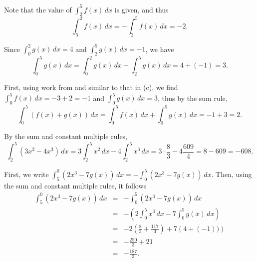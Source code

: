 \begin{activitySolution}
\ba
	\item Note that the value of $\int_2^5 f(x) \, dx$ is given, and thus
	$$\int_5^2 f(x) \,dx = -\int_2^5 f(x) \, dx = -2.$$
	\item Since $\int_0^2 g(x) \,dx = 4$ and $\int_2^5 g(x) \,dx = -1$, we have
	$$\int_0^5 g(x) \,dx = \int_0^2 g(x) \,dx + \int_2^5 g(x) \,dx = 4 + (-1) = 3.$$
	\item First, using work from and similar to that in (c), we find $\int_0^5 f(x) \, dx = -3 + 2 = -1$ and $\int_0^5 g(x) \, dx = 3$, thus by the sum rule,
	$$\int_0^5 (f(x) + g(x))\, dx = \int_0^5 f(x)\, dx + \int_0^5 g(x)\, dx = -1 + 3 = 2.$$
	\item By the sum and constant multiple rules,
	$$\int_2^5 (3x^2 - 4x^3) \, dx = 3\int_2^5 x^2 \, dx - 4\int_2^5 x^3 \, dx = 3 \cdot \frac{8}{3} - 4 \frac{609}{4} = 8 - 609 = -608.$$
	\item First, we write $\int_5^0 (2x^3 - 7g(x)) \, dx = -\int_0^5 (2x^3 - 7g(x)) \, dx$.  Then, using the sum and constant multiple rules, it follows
\begin{eqnarray*}
	\int_5^0 (2x^3 - 7g(x)) \, dx & = & -\int_0^5 (2x^3 - 7g(x)) \, dx \\
					& = & -\left(2 \int_0^5 x^3 \, dx - 7 \int_0^5 g(x) \,dx \right) \\
					& = & -2 \left(\frac{8}{3} + \frac{117}{3}\right)  + 7 \left(4 +  (-1))\right) \\
					& = & -\frac{250}{3} + 21 \\
					& = & -\frac{187}{3}.
\end{eqnarray*}
\ea
\end{activitySolution}
\aftera